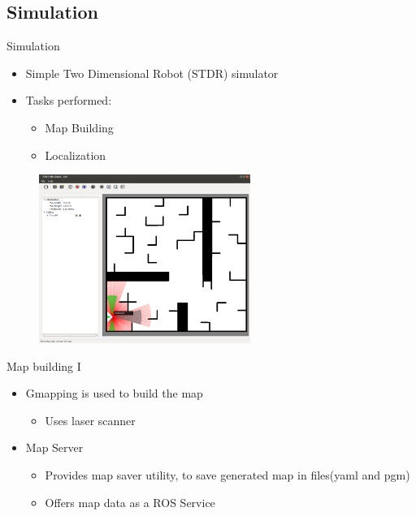 
\subsection{Simulation}

\begin{frame}{Simulation}
    \begin{itemize}
        \item Simple Two Dimensional Robot (STDR) simulator	
        \item Tasks  performed:
        \begin{itemize}
            \item Map Building
            \item Localization
        \end{itemize}
    \end{itemize}
    
    \centering
    \includegraphics[width=90mm,height=55mm]{gfx/stdr_simulator}
    
\end{frame}
\begin{frame}{Map building I}
    \begin{itemize}
        \item Gmapping is used to build the map
        \begin{itemize}
            \item Uses laser scanner 
        \end{itemize}
        \item Map Server
        \begin{itemize}
            \item Provides map saver utility, to save generated map in files(yaml and pgm)
            \item Offers map data as a ROS Service
        \end{itemize}
        
    \end{itemize}
\end{frame}
